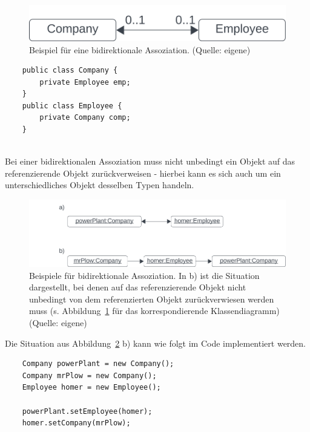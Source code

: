 \begin{figure}
    \centering
    \includegraphics[scale=0.5]{chapters/fopt3/img/bidirectionalassociation}
    \caption{Beispiel für eine bidirektionale Assoziation. (Quelle: eigene)}
    \label{fig:bidirectionalassociation}
\end{figure}


\begin{verbatim}
    public class Company {
        private Employee emp;
    }
    public class Employee {
        private Company comp;
    }
\end{verbatim}\\

\noindent
    Bei einer bidirektionalen Assoziation muss nicht unbedingt ein Objekt auf das referenzierende Objekt zurückverweisen - hierbei kann es sich auch um ein unterschiedliches Objekt desselben Typen handeln.\\

\begin{figure}
    \centering
    \includegraphics[scale=0.5]{chapters/fopt3/img/bidirectionalassocexample}
    \caption{Beispiele für bidirektionale Assoziation. In b) ist die Situation dargestellt, bei denen auf das referenzierende Objekt nicht unbedingt von dem
    referenzierten Objekt zurückverwiesen werden muss (s. Abbildung~\ref{fig:bidirectionalassociation} für das korrespondierende Klassendiagramm) (Quelle: eigene)}
    \label{fig:bidirectionalassocexample}
\end{figure}

\newpage
Die Situation aus Abbildung~\ref{fig:bidirectionalassocexample} b) kann wie folgt im Code implementiert werden.

\begin{verbatim}
    Company powerPlant = new Company();
    Company mrPlow = new Company();
    Employee homer = new Employee();

    powerPlant.setEmployee(homer);
    homer.setCompany(mrPlow);
\end{verbatim}\\

